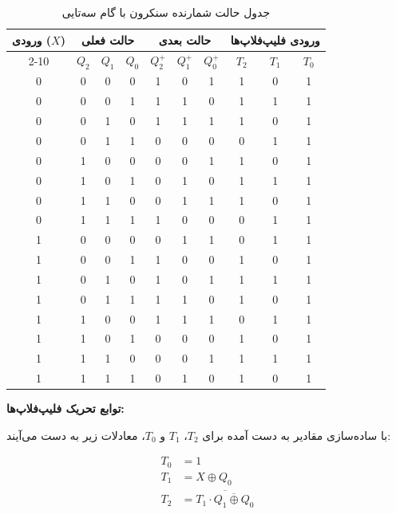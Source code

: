 \documentclass[a4paper,12pt]{article}
\numberwithin{figure}{subsection}
\begin{document}
\begin{table}[htbp]
\centering
\caption{جدول حالت شمارنده سنکرون با گام سه‌تایی}
\label{tab:state_table}
\renewcommand{\arraystretch}{1.2}
\begin{tabular}{|c|ccc|ccc|ccc|}
\hline
\multirow{2}{*}{\textbf{ورودی ($X$)}} & \multicolumn{3}{c|}{\textbf{حالت فعلی}} & \multicolumn{3}{c|}{\textbf{حالت بعدی}} & \multicolumn{3}{c|}{\textbf{ورودی فلیپ‌فلاپ‌ها}} \\ \cline{2-10} 
 & \textbf{$Q_2$} & \textbf{$Q_1$} & \textbf{$Q_0$} & \textbf{$Q_2^+$} & \textbf{$Q_1^+$} & \textbf{$Q_0^+$} & \textbf{$T_2$} & \textbf{$T_1$} & \textbf{$T_0$} \\ \hline
0 & 0 & 0 & 0 & 1 & 0 & 1 & 1 & 0 & 1 \\
0 & 0 & 0 & 1 & 1 & 1 & 0 & 1 & 1 & 1 \\
0 & 0 & 1 & 0 & 1 & 1 & 1 & 1 & 0 & 1 \\
0 & 0 & 1 & 1 & 0 & 0 & 0 & 0 & 1 & 1 \\
0 & 1 & 0 & 0 & 0 & 0 & 1 & 1 & 0 & 1 \\
0 & 1 & 0 & 1 & 0 & 1 & 0 & 1 & 1 & 1 \\
0 & 1 & 1 & 0 & 0 & 1 & 1 & 1 & 0 & 1 \\
0 & 1 & 1 & 1 & 1 & 0 & 0 & 0 & 1 & 1 \\ \hline
1 & 0 & 0 & 0 & 0 & 1 & 1 & 0 & 1 & 1 \\
1 & 0 & 0 & 1 & 1 & 0 & 0 & 1 & 0 & 1 \\
1 & 0 & 1 & 0 & 1 & 0 & 1 & 1 & 1 & 1 \\
1 & 0 & 1 & 1 & 1 & 1 & 0 & 1 & 0 & 1 \\
1 & 1 & 0 & 0 & 1 & 1 & 1 & 0 & 1 & 1 \\
1 & 1 & 0 & 1 & 0 & 0 & 0 & 1 & 0 & 1 \\
1 & 1 & 1 & 0 & 0 & 0 & 1 & 1 & 1 & 1 \\
1 & 1 & 1 & 1 & 0 & 1 & 0 & 1 & 0 & 1 \\ \hline
\end{tabular}
\end{table}

\vspace{0.5cm}

\textbf{توابع تحریک فلیپ‌فلاپ‌ها:}

با ساده‌سازی مقادیر به دست آمده برای $T_2$، $T_1$ و $T_0$، معادلات زیر به دست می‌آیند:

\begin{align*}
T_0 &= 1 \\
T_1 &= X \oplus Q_0 \\
T_2 &= \overline{T_1 \cdot \overline{Q_1 \oplus Q_0}}
\end{align*}
\end{document}
